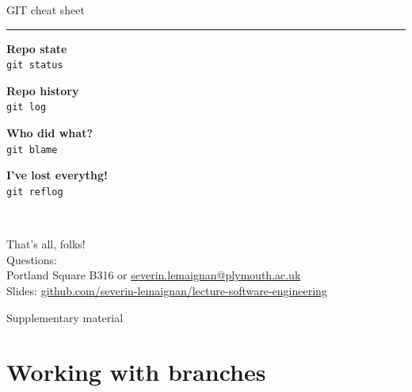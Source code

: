 \documentclass[compress]{beamer}
\begin{document}
\begin{frame}{GIT cheat sheet}
\begin{multicols}{2}
    \rule{\columnwidth}{0.2pt}

    \begin{multicols}{2}
    {\bf Repo state}\\
    \texttt{git status}\par

    {\bf Repo history}\\
    \texttt{git log}\par

    {\bf Who did what?}\\
    \texttt{git blame}\par

    {\bf I've lost everythg!}\\
    \texttt{git reflog}\par


    \end{multicols}

    ~\\

    \end{multicols}

\end{frame}

{
\begin{frame}[plain]
        \Large
        That's all, folks!\\[2em]
        \normalsize
        Questions:\\
        Portland Square B316 or \url{severin.lemaignan@plymouth.ac.uk} \\[1em]

        Slides:
        \href{https://github.com/severin-lemaignan/lecture-software-engineering}{\small
        github.com/severin-lemaignan/lecture-software-engineering}

\end{frame}
}

\appendix

\begin{frame}{Supplementary material}
    \tableofcontents[hideallsubsections]
\end{frame}


\section{Working with branches}
\end{document}
